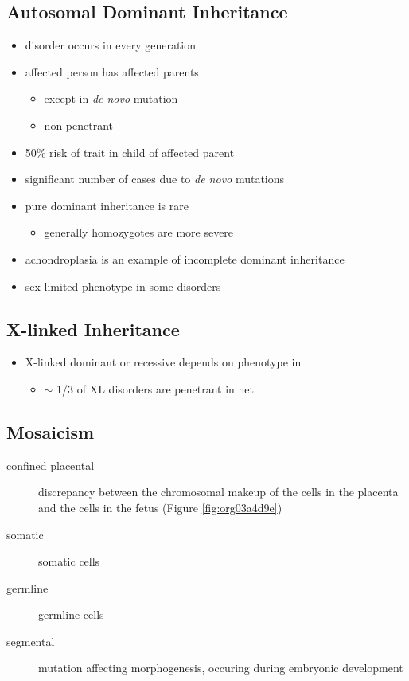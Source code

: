 \documentclass[12pt]{scrartcl}
\begin{document}
\subsection{Autosomal Dominant Inheritance}
\label{sec:org1cc9410}
\begin{itemize}
\item disorder occurs in every generation
\item affected person has affected parents
\begin{itemize}
\item except in \emph{de novo} mutation
\item non-penetrant
\end{itemize}
\item 50\% risk of trait in child of affected parent
\item significant number of cases due to \emph{de novo} mutations

\item pure dominant inheritance is rare
\begin{itemize}
\item generally homozygotes are more severe
\end{itemize}
\item achondroplasia is an example of incomplete dominant inheritance
\item sex limited phenotype in some disorders
\end{itemize}

\subsection{X-linked Inheritance}
\label{sec:orgdc782f1}
\begin{itemize}
\item X-linked dominant or recessive depends on phenotype in \female
\begin{itemize}
\item \(\sim\) 1/3 of XL disorders are penetrant in het \female
\end{itemize}
\end{itemize}

\subsection{Mosaicism}
\label{sec:org9474a6e}
\begin{description}
\item[{confined placental}] discrepancy between the chromosomal makeup of
the cells in the placenta and the cells in the fetus (Figure \ref{fig:org03a4d9e})
\item[{somatic}] somatic cells
\item[{germline}] germline cells
\item[{segmental}] mutation affecting morphogenesis, occuring during
embryonic development
\end{description}
\end{document}
